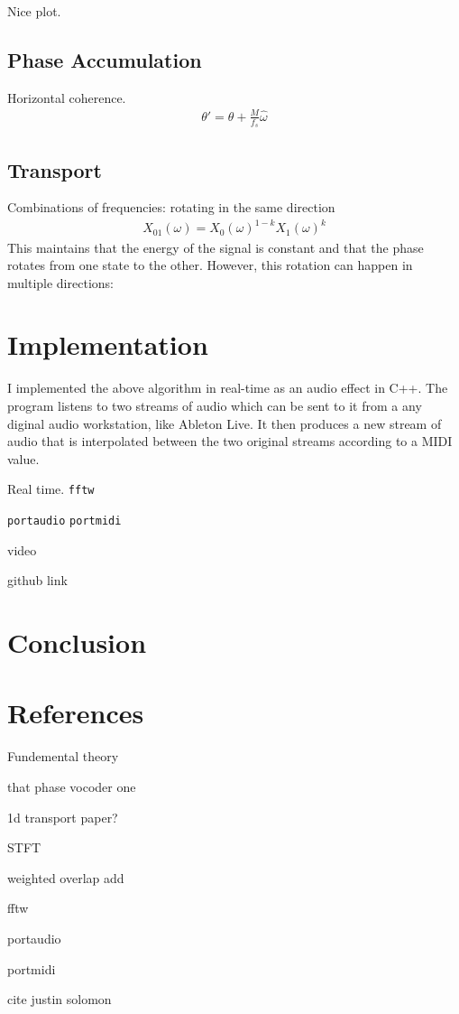 \documentclass[12pt]{article}
\begin{document}
Nice plot.

\subsection{Phase Accumulation}
Horizontal coherence.
\begin{align*}
  \theta' = \theta + \frac{M}{f_s}\hat{\omega} 
\end{align*}

\subsection{Transport}

Combinations of frequencies:
rotating in the same direction
\begin{align}
  X_{01}(\omega) = 
  X_0(\omega)^{1-k}
  X_1(\omega)^k
\end{align}
This maintains that the energy of the signal is constant and that the phase rotates from one state to the other.
However, this rotation can happen in multiple directions:

\section{Implementation}

I implemented the above algorithm in real-time as an audio effect in C++.
The program listens to two streams of audio
which can be sent to it from a any diginal audio workstation, like Ableton Live.
It then produces a new stream of audio that is interpolated between the two original streams according to a MIDI value.



Real time.
\texttt{fftw}

\texttt{portaudio}
\texttt{portmidi}

video

github link

\section{Conclusion}

\section{References}

Fundemental theory

that phase vocoder one

1d transport paper?

STFT

weighted overlap add

fftw

portaudio

portmidi

cite justin solomon
\end{document}
